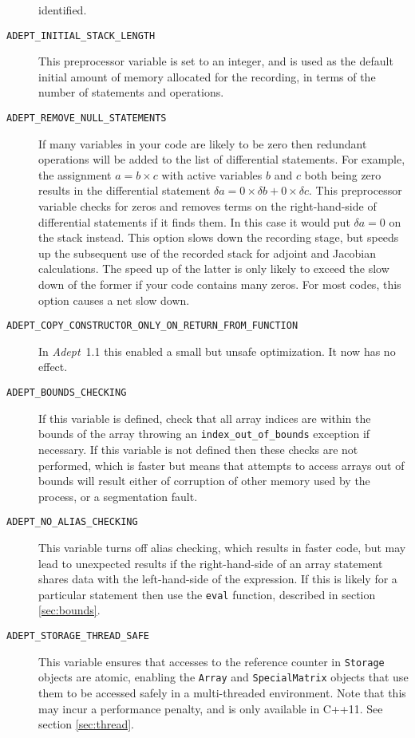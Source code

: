 \documentclass[a4,oneside]{book}
\def\codesize{\small}
\def\Adept{\emph{Adept}}
\def\code#1{{\codesize\texttt{#1}}}
\def\citem#1{\item[{\codesize\texttt{#1}}]}
\begin{document}
\begin{description}
identified.
%
\citem{ADEPT\_INITIAL\_STACK\_LENGTH} This preprocessor variable is
set to an integer, and is used as the default initial amount of memory
allocated for the recording, in terms of the number of statements and
operations.
%
\citem{ADEPT\_REMOVE\_NULL\_STATEMENTS} If many variables in your code
are likely to be zero then redundant operations will be added to the
list of differential statements. For example, the assignment
$a=b\times c$ with active variables $b$ and $c$ both being zero
results in the differential statement $\delta a=0\times\delta
b+0\times\delta c$. This preprocessor variable checks for zeros and
removes terms on the right-hand-side of differential statements if it
finds them. In this case it would put $\delta a=0$ on the stack
instead. This option slows down the recording stage, but speeds up the
subsequent use of the recorded stack for adjoint and Jacobian
calculations. The speed up of the latter is only likely to exceed the
slow down of the former if your code contains many zeros. For most
codes, this option causes a net slow down.
%
\citem{ADEPT\_COPY\_CONSTRUCTOR\_ONLY\_ON\_RETURN\_FROM\_FUNCTION} In
\Adept\ 1.1 this enabled a small but unsafe optimization. It now has
no effect.
%
\citem{ADEPT\_BOUNDS\_CHECKING} If this variable is defined, check
that all array indices are within the bounds of the array throwing an
\code{index\_out\_of\_bounds} exception if necessary.  If this
variable is not defined then these checks are not performed, which is
faster but means that attempts to access arrays out of bounds will
result either of corruption of other memory used by the process, or a
segmentation fault. 
\citem{ADEPT\_NO\_ALIAS\_CHECKING} This variable turns off alias
checking, which results in faster code, but may lead to unexpected
results if the right-hand-side of an array statement shares data with
the left-hand-side of the expression. If this is likely for a
particular statement then use the \code{eval} function, described in
section \ref{sec:bounds}.
\citem{ADEPT\_STORAGE\_THREAD\_SAFE} This variable ensures that
accesses to the reference counter in \code{Storage} objects are
atomic, enabling the \code{Array} and \code{SpecialMatrix} objects
that use them to be accessed safely in a multi-threaded
environment. Note that this may incur a performance penalty, and is
only available in C++11. See section \ref{sec:thread}.
\end{description}
\end{document}

